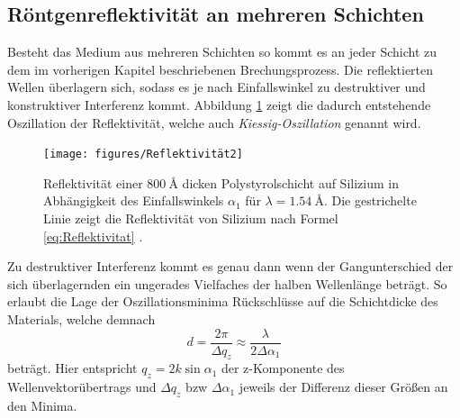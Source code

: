 \subsection{Röntgenreflektivität an mehreren Schichten}
Besteht das Medium aus mehreren Schichten so kommt es an jeder Schicht zu dem im vorherigen Kapitel beschriebenen Brechungsprozess.
Die reflektierten Wellen überlagern sich, sodass es je nach Einfallswinkel zu destruktiver und konstruktiver Interferenz kommt.
Abbildung \ref{fig:tfig3} zeigt die dadurch entstehende Oszillation der Reflektivität, welche auch \textit{Kiessig-Oszillation} genannt wird.
\begin{figure}[H]
\centering
\texttt{[image: figures/Reflektivität2]}
\caption{Reflektivität einer $\SI{800}{\angstrom}$ dicken Polystyrolschicht auf Silizium in Abhängigkeit des Einfallswinkels $\alpha_1$ für $\lambda = \SI{1,54}{\angstrom}$.
Die gestrichelte Linie zeigt die Reflektivität von Silizium nach Formel \eqref{eq:Reflektivitat} \cite{skript}.}
\label{fig:tfig3}
\end{figure}
Zu destruktiver Interferenz kommt es genau dann wenn der Gangunterschied der sich überlagernden ein ungerades Vielfaches der halben Wellenlänge beträgt.
So erlaubt die Lage der Oszillationsminima Rückschlüsse auf die Schichtdicke des Materials, welche demnach
\begin{equation}
    d = \frac{2\pi}{\Delta q_z}\approx \frac{\lambda}{2\Delta \alpha_1}
\end{equation}
beträgt.
Hier entspricht $q_z=2k\sin{\alpha_1}$ der z-Komponente des Wellenvektorübertrags und $\Delta q_z$ bzw $\Delta \alpha_1$ jeweils der Differenz dieser Größen an den Minima.

